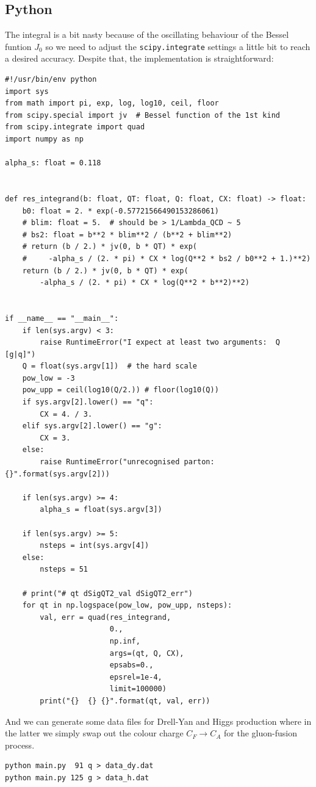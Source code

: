 \documentclass[11pt]{article}
\begin{document}
\subsection{Python}
\label{sec:org2e3e44d}
The integral is a bit nasty because of the oscillating behaviour of the Bessel funtion \(J_0\) so we need to adjust the \texttt{scipy.integrate} settings a little bit to reach a desired accuracy.
Despite that, the implementation is straightforward:
\begin{verbatim}
#!/usr/bin/env python
import sys
from math import pi, exp, log, log10, ceil, floor
from scipy.special import jv  # Bessel function of the 1st kind
from scipy.integrate import quad
import numpy as np

alpha_s: float = 0.118


def res_integrand(b: float, QT: float, Q: float, CX: float) -> float:
    b0: float = 2. * exp(-0.57721566490153286061)
    # blim: float = 5.  # should be > 1/Lambda_QCD ~ 5
    # bs2: float = b**2 * blim**2 / (b**2 + blim**2)
    # return (b / 2.) * jv(0, b * QT) * exp(
    #     -alpha_s / (2. * pi) * CX * log(Q**2 * bs2 / b0**2 + 1.)**2)
    return (b / 2.) * jv(0, b * QT) * exp(
        -alpha_s / (2. * pi) * CX * log(Q**2 * b**2)**2)


if __name__ == "__main__":
    if len(sys.argv) < 3:
        raise RuntimeError("I expect at least two arguments:  Q [g|q]")
    Q = float(sys.argv[1])  # the hard scale
    pow_low = -3
    pow_upp = ceil(log10(Q/2.)) # floor(log10(Q))
    if sys.argv[2].lower() == "q":
        CX = 4. / 3.
    elif sys.argv[2].lower() == "g":
        CX = 3.
    else:
        raise RuntimeError("unrecognised parton: {}".format(sys.argv[2]))

    if len(sys.argv) >= 4:
        alpha_s = float(sys.argv[3])

    if len(sys.argv) >= 5:
        nsteps = int(sys.argv[4])
    else:
        nsteps = 51

    # print("# qt dSigQT2_val dSigQT2_err")
    for qt in np.logspace(pow_low, pow_upp, nsteps):
        val, err = quad(res_integrand,
                        0.,
                        np.inf,
                        args=(qt, Q, CX),
                        epsabs=0.,
                        epsrel=1e-4,
                        limit=100000)
        print("{}  {} {}".format(qt, val, err))
\end{verbatim}

And we can generate some data files for Drell-Yan and Higgs production where in the latter we simply swap out the colour charge \(C_F \to C_A\) for the gluon-fusion process.
\begin{verbatim}
python main.py  91 q > data_dy.dat
python main.py 125 g > data_h.dat
\end{verbatim}
\end{document}
